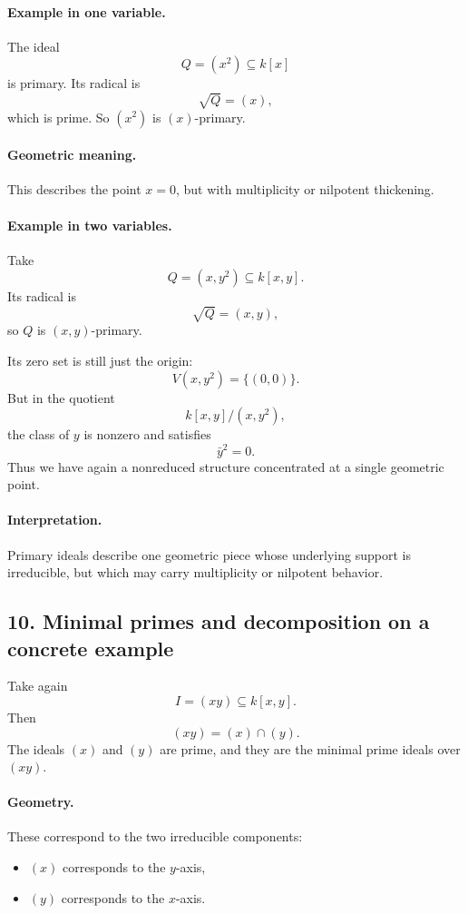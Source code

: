 \documentclass[12pt,a4paper]{article}
\theoremstyle{plain}
\theoremstyle{definition}      %
\begin{document}
	\paragraph{Example in one variable.}
	The ideal
	\[
	Q=(x^2)\subseteq k[x]
	\]
	is primary. Its radical is
	\[
	\sqrt{Q}=(x),
	\]
	which is prime. So \((x^2)\) is \((x)\)-primary.
	
	\paragraph{Geometric meaning.}
	This describes the point \(x=0\), but with multiplicity or nilpotent thickening.
	
	\paragraph{Example in two variables.}
	Take
	\[
	Q=(x,y^2)\subseteq k[x,y].
	\]
	Its radical is
	\[
	\sqrt{Q}=(x,y),
	\]
	so \(Q\) is \((x,y)\)-primary.
	
	Its zero set is still just the origin:
	\[
	V(x,y^2)=\{(0,0)\}.
	\]
	But in the quotient
	\[
	k[x,y]/(x,y^2),
	\]
	the class of \(y\) is nonzero and satisfies
	\[
	\bar y^2=0.
	\]
	Thus we have again a nonreduced structure concentrated at a single geometric point.
	
	\paragraph{Interpretation.}
	Primary ideals describe one geometric piece whose underlying support is irreducible, but which may carry multiplicity or nilpotent behavior.
	
	\subsection*{10. Minimal primes and decomposition on a concrete example}
	
	Take again
	\[
	I=(xy)\subseteq k[x,y].
	\]
	Then
	\[
	(xy)=(x)\cap (y).
	\]
	The ideals \((x)\) and \((y)\) are prime, and they are the minimal prime ideals over \((xy)\).
	
	\paragraph{Geometry.}
	These correspond to the two irreducible components:
	\begin{itemize}
		\item \((x)\) corresponds to the \(y\)-axis,
		\item \((y)\) corresponds to the \(x\)-axis.
	\end{itemize}
	
\end{document}
